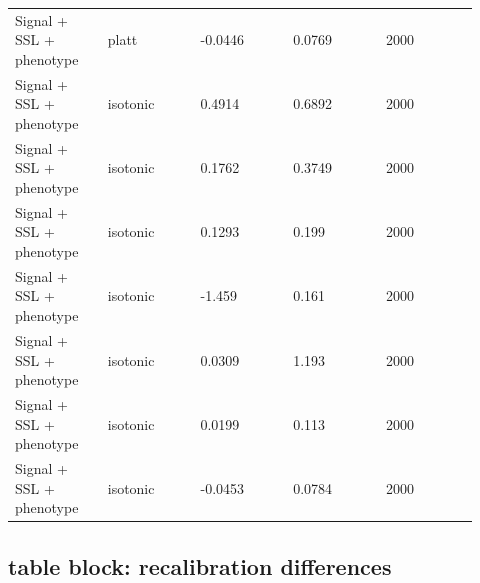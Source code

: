 \documentclass[11pt]{article}
\begin{document}
\begin{landscape}
\begin{longtable}{L{0.184\linewidth} L{0.184\linewidth} L{0.184\linewidth} L{0.184\linewidth} L{0.184\linewidth}}
Signal + SSL + phenotype & platt & -\allowbreak{}0.\allowbreak{}0446 & 0.\allowbreak{}0769 & 2000 \\
Signal + SSL + phenotype & isotonic & 0.\allowbreak{}4914 & 0.\allowbreak{}6892 & 2000 \\
Signal + SSL + phenotype & isotonic & 0.\allowbreak{}1762 & 0.\allowbreak{}3749 & 2000 \\
Signal + SSL + phenotype & isotonic & 0.\allowbreak{}1293 & 0.\allowbreak{}199 & 2000 \\
Signal + SSL + phenotype & isotonic & -\allowbreak{}1.\allowbreak{}459 & 0.\allowbreak{}161 & 2000 \\
Signal + SSL + phenotype & isotonic & 0.\allowbreak{}0309 & 1.\allowbreak{}193 & 2000 \\
Signal + SSL + phenotype & isotonic & 0.\allowbreak{}0199 & 0.\allowbreak{}113 & 2000 \\
Signal + SSL + phenotype & isotonic & -\allowbreak{}0.\allowbreak{}0453 & 0.\allowbreak{}0784 & 2000 \\
\end{longtable}
\normalsize
\end{landscape}


\subsection*{table block: recalibration differences}
\end{document}
